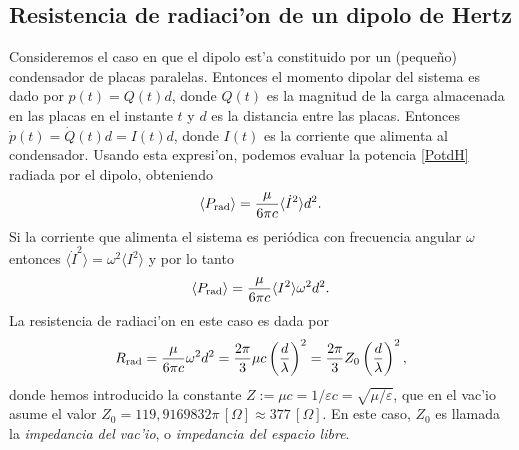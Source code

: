 \subsection{Resistencia de radiaci'on de un dipolo de Hertz}\label{sec:RRdH}
Consideremos el caso en que el dipolo est'a constituido por un (pequeño) condensador de placas paralelas. Entonces el momento dipolar del sistema es dado por $p(t)=Q(t)d$, donde $Q(t)$ es la magnitud de la carga almacenada en las placas en el instante $t$ y $d$ es la distancia entre las placas. Entonces $\dot{p}(t)=\dot{Q}(t)d=I(t)d$, donde $I(t)$ es la corriente que alimenta al condensador. Usando esta expresi'on, podemos evaluar la potencia \eqref{PotdH} radiada por el dipolo, obteniendo
\begin{equation}
\left\langle P_{\rm rad}\right\rangle=\frac{\mu}{6\pi c}{\langle\dot{I}^2\rangle d^2}.
\end{equation}
Si la corriente que alimenta el sistema es periódica con frecuencia angular $\omega$ entonces $\langle\dot{I}^2\rangle=\omega^2\langle I^2\rangle$ y por lo tanto
\begin{equation}
\left\langle P_{\rm rad}\right\rangle=\frac{\mu}{6\pi c}{\langle I^2\rangle \omega^2d^2}.
\end{equation}
La resistencia de radiaci'on en este caso es dada por
\begin{equation}\label{Rradp}
R_{\rm rad}=\frac{\mu}{6\pi c}{\omega^2d^2}
=\frac{2\pi}{3}\mu c\left(\frac{d}{\lambda}\right)^2
=\frac{2\pi}{3}Z_0\left(\frac{d}{\lambda}\right)^2,
\end{equation}
donde hemos introducido la constante $Z:=\mu c=1/\varepsilon c=\sqrt{\mu/\varepsilon}$, que en el vac'io asume el valor $Z_0=119,9169832\pi\,[\Omega]\approx 377\,[\Omega]$. En este caso, $Z_0$ es llamada la \textit{impedancia del vac'io}, o \textit{impedancia del espacio libre}.

